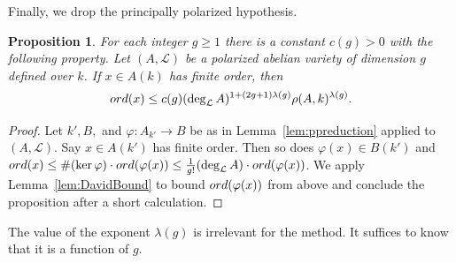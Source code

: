 \documentclass[12pt,oneside]{amsart}
\newcounter{maincounter}
\numberwithin{maincounter}{section}
\numberwithin{equation}{section}
\newtheorem{proposition}[maincounter]{Proposition}
\newcommand{\cL}{{\mathcal L}}
\newcommand{\ord}[1]{{\rm ord}({#1})}
\begin{document}
Finally, we drop the principally polarized hypothesis.
\begin{proposition}\label{PropDavidBound}
  For each integer $g\ge 1$ there is a constant $c(g)>0$ with the
  following property. Let $(A,\cL)$ be a
  polarized abelian variety of dimension $g$ defined over $k$. If $x\in
  A(k)$ has finite order, then
  $$\ord{x}\le c(g)
  (\deg_\cL A)^{1+(2g+1)\lambda(g)} \rho(A,k)^{\lambda(g)}.$$
\end{proposition}
\begin{proof}
  Let $k',B,$ and $\varphi\colon A_{k'}\rightarrow B$ be as in
  Lemma~\ref{lem:ppreduction} applied to $(A,\cL)$.
  Say $x\in A(k')$ has finite order. Then so does $\varphi(x) \in B(k')$ and
  $\ord{x}\le \#(\ker\varphi)\cdot \ord{
    \varphi(x)} \le \frac{1}{g!}(\deg_\cL A) \cdot \ord{\varphi(x)}$.
  We apply Lemma~\ref{lem:DavidBound} to bound 
  $\ord{\varphi(x)}$ from above and conclude the proposition after a
  short calculation.
\end{proof}

The value of the exponent $\lambda(g)$ is irrelevant for the
method. It suffices to know that it is a function of $g$.








\end{document}
